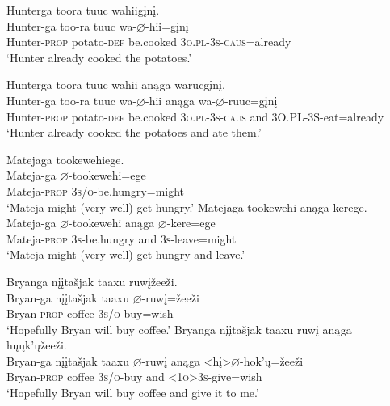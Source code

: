 \documentclass[output=paper]{LSP/langsci}
\begin{document}
\begin{exe}
\ex\label{ex:jrs:32}
\begin{xlist}  
\ex
\glll Hunterga 	toora 	tuuc 	wahiig\k{i}n\k{i}. \\
Hunter-ga 	too-ra 	tuuc 	wa-$\varnothing$-hii=g\k{i}n\k{i} \\
	Hunter-\textsc{prop} potato-\textsc{def} 	be.cooked 	\textsc{3o.pl-3s-caus}=already \\
\trans `Hunter already cooked the potatoes.' 

\ex
\glll Hunterga  	toora 		tuuc 		wahii 	anąga 	warucg\k{i}n\k{i}. \\
Hunter-ga  too-ra	tuuc 	wa-$\varnothing$-hii 	 anąga wa-$\varnothing$-ruuc=g\k{i}n\k{i} \\
Hunter-\textsc{prop} potato-\textsc{def} 	be.cooked	 \textsc{3o.pl-3s-caus} and 3O.PL-3S-eat=already\\
\trans`Hunter already cooked the potatoes and ate them.'
\end{xlist}
\ex\label{ex:jrs:33}
\begin{xlist} 
\ex
\glll Matejaga 	tookewehiege. \\
Mateja-ga 	$\varnothing$-tookewehi=ege \\
	Mateja-\textsc{prop} 	\textsc{3s/o}-be.hungry=might \\
\trans `Mateja might (very well) get hungry.' 
\ex
\glll Matejaga 			tookewehi 		anąga 	kerege. \\
Mateja-ga 			$\varnothing$-tookewehi 	anąga 	$\varnothing$-kere=ege  \\
Mateja-\textsc{prop} 	\textsc{3s}-be.hungry and 			\textsc{3s}-leave=might \\
\trans `Mateja might (very well) get hungry and leave.'
\end{xlist}

\ex\label{ex:jrs:34}	
\begin{xlist} 
\ex
\glll Bryanga 			{n\k{i}\k{i}ta\v{s}jak taaxu }	ruw\k{i}\v{z}ee\v{z}i. \\
Bryan-ga 		{n\k{i}\k{i}ta\v{s}jak 	taaxu }	$\varnothing$-ruw\k{i}=\v{z}ee\v{z}i \\
	Bryan-\textsc{prop} 	coffee	\textsc{3s/o}-buy=wish \\
\trans `Hopefully Bryan will buy coffee.' 
\ex
\glll Bryanga 	{n\k{i}\k{i}ta\v{s}jak taaxu }	ruw\k{i} 		anąga 	h\k{u}\k{u}k'\k{u}\v{z}ee\v{z}i. \\
Bryan-ga 	{n\k{i}\k{i}ta\v{s}jak taaxu }	$\varnothing$-ruw\k{i}  	anąga 	<h\k{i}>$\varnothing$-hok'\k{u}=\v{z}ee\v{z}i \\
	Bryan-\textsc{prop} 	coffee 		\textsc{3s/o}-buy		 and 		\textsc{<1o>3s}-give=wish \\
\trans `Hopefully Bryan will buy coffee and give it to me.'
\end{xlist}
\end{exe}	
	
\end{document}
